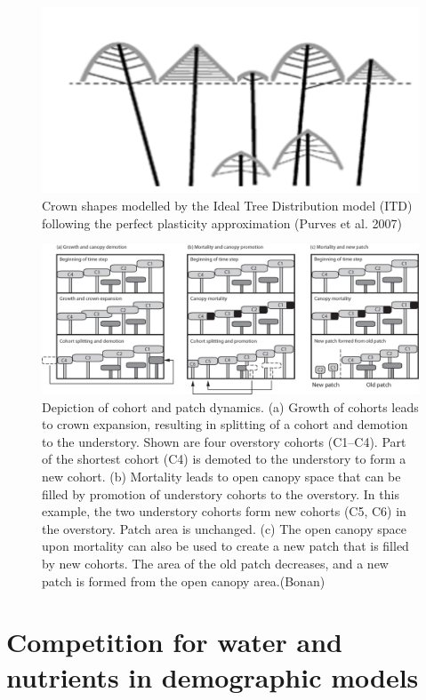\documentclass[
  12pt,
  oneside]{book}
\begin{document}
\begin{figure}

{\centering \includegraphics[width=0.8\linewidth]{figures/chap6/f629_ppa_purves} 

}

\caption{Crown shapes modelled by the Ideal Tree Distribution model (ITD) following the perfect plasticity approximation (Purves et al. 2007)}\label{fig:f629}
\end{figure}

\begin{figure}

{\centering \includegraphics[width=0.8\linewidth]{figures/chap6/f630_canopy_dynamics} 

}

\caption{Depiction of cohort and patch dynamics. (a) Growth of cohorts leads to crown expansion, resulting in splitting of a cohort and demotion to the understory. Shown are four overstory cohorts (C1–C4). Part of the shortest cohort (C4) is demoted to the understory to form a new cohort. (b) Mortality leads to open canopy space that can be filled by promotion of understory cohorts to the overstory. In this example, the two understory cohorts form new cohorts (C5, C6) in the overstory. Patch area is unchanged. (c) The open canopy space upon mortality can also be used to create a new patch that is filled by new cohorts. The area of the old patch decreases, and a new patch is formed from the open canopy area.(Bonan)}\label{fig:f630}
\end{figure}

\hypertarget{competition-for-water-and-nutrients-in-demographic-models}{%
\section{Competition for water and nutrients in demographic models}\label{competition-for-water-and-nutrients-in-demographic-models}}
\end{document}
